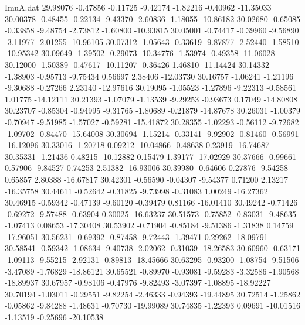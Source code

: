 \begin{filecontents}{ImuA.dat}
  29.98076   -0.47856   -0.11725   -9.42174   -1.82216   -0.40962  -11.35033
  30.00378   -0.48455   -0.22134   -9.43370   -2.60836   -1.18055  -10.86182
  30.02680   -0.65085   -0.33858   -9.48754   -2.73812   -1.60800  -10.93815
  30.05001   -0.74417   -0.39960   -9.56890   -3.11977   -2.01255  -10.96105
  30.07312   -1.05643   -0.33619   -9.87877   -2.52440   -1.58510  -10.95342
  30.09649   -1.39502   -0.29073  -10.34776   -1.53974   -0.49358  -11.06028
  30.12000   -1.50389   -0.47617  -10.11207   -0.36426    1.46810  -11.14424
  30.14332   -1.38903   -0.95713   -9.75434    0.56697    2.38406  -12.03730
  30.16757   -1.06241   -1.21196   -9.30688   -0.27266    2.23140  -12.97616
  30.19095   -1.05523   -1.27896   -9.22313   -0.58561    1.01775  -14.12111
  30.21393   -1.07079   -1.13539   -9.29253   -0.93673    0.17049  -14.80808
  30.23707   -0.85304   -0.94995   -9.31765   -1.80689   -0.21879  -14.87678
  30.26031   -1.00379   -0.70947   -9.51985   -1.57027   -0.59281  -15.41872
  30.28355   -1.02293   -0.56112   -9.72682   -1.09702   -0.84470  -15.64008
  30.30694   -1.15214   -0.33141   -9.92902   -0.81460   -0.56991  -16.12096
  30.33016   -1.20718    0.09212  -10.04866   -0.48638    0.23919  -16.74687
  30.35331   -1.21436    0.48215  -10.12882    0.15479    1.39177  -17.02929
  30.37666   -0.99661    0.57906   -9.84527    0.74253    2.51382  -16.93006
  30.39980   -0.64606    0.27876   -9.54258    0.65857    2.80388  -16.67817
  30.42301   -0.56590   -0.04307   -9.54377    0.71200    2.13217  -16.35758
  30.44611   -0.52642   -0.31825   -9.73998   -0.31083    1.00249  -16.27362
  30.46915   -0.59342   -0.47139   -9.60120   -0.39479    0.81166  -16.01410
  30.49242   -0.71426   -0.69272   -9.57488   -0.63904    0.30025  -16.63237
  30.51573   -0.75852   -0.83031   -9.48635   -1.07413    0.08653  -17.30408
  30.53902   -0.71904   -0.85184   -9.51386   -1.31838    0.14759  -17.96051
  30.56231   -0.69392   -0.87458   -9.72443   -1.39471    0.29262  -18.09791
  30.58541   -0.59342   -1.08634   -9.40738   -2.02062   -0.31039  -18.26583
  30.60960   -0.63171   -1.09113   -9.55215   -2.92131   -0.89813  -18.45666
  30.63295   -0.93200   -1.08754   -9.51506   -3.47089   -1.76829  -18.86121
  30.65521   -0.89970   -0.93081   -9.59283   -3.32586   -1.90568  -18.89937
  30.67957   -0.98106   -0.47976   -9.82493   -3.07397   -1.08895  -18.92227
  30.70194   -1.03011   -0.29551   -9.82254   -2.46333   -0.94393  -19.44895
  30.72514   -1.25862   -0.05862   -9.84288   -1.48631   -0.70730  -19.99089
  30.74835   -1.22393    0.09691  -10.01516   -1.13519   -0.25696  -20.10538

\end{filecontents}
